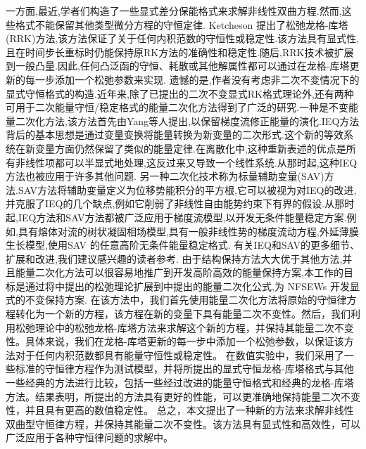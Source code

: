 一方面,最近,学者们构造了一些显式差分保能格式来求解非线性双曲方程\cite{macias-diazExplicitDissipationpreservingMethod2018,zhaoExplicitFourthorderEnergypreserving2019,fuExplicitStructurepreservingAlgorithm2020}.然而,这些格式不能保留其他类型微分方程的守恒定律.
Ketcheson \cite{ketchesonRelaxationRungeKutta2019}提出了松弛龙格-库塔(RRK)方法,该方法保证了关于任何内积范数的守恒性或稳定性.该方法具有显式性,且在时间步长重标时仍能保持原RK方法的准确性和稳定性.随后,RRK技术被扩展到一般凸量\cite{ranochaRelaxationRungeKutta2020}.因此,任何凸泛函的守恒、耗散或其他解属性都可以通过在龙格-库塔更新的每一步添加一个松弛参数来实现.
遗憾的是,作者没有考虑非二次不变情况下的显式守恒格式的构造.近年来,除了已提出的二次不变显式RK格式理论外,还有两种可用于二次能量守恒/稳定格式的能量二次化方法得到了广泛的研究.一种是不变能量二次化方法,该方法首先由Yang等人提出,以保留梯度流修正能量的演化.IEQ方法背后的基本思想是通过变量变换将能量转换为新变量的二次形式.这个新的等效系统在新变量方面仍然保留了类似的能量定律.在离散化中,这种重新表述的优点是所有非线性项都可以半显式地处理,这反过来又导致一个线性系统.从那时起,这种IEQ方法也被应用于许多其他问题.
另一种二次化技术称为标量辅助变量(SAV)方法.SAV方法将辅助变量定义为位移势能积分的平方根,它可以被视为对IEQ的改进,并克服了IEQ的几个缺点,例如它削弱了非线性自由能势约束下有界的假设.从那时起,IEQ方法和SAV方法都被广泛应用于梯度流模型,以开发无条件能量稳定方案.例如,具有熔体对流\cite{chenEfficientNumericalScheme2019}的树状凝固相场模型,具有一般非线性势的梯度流动方程\cite{yangConvergenceAnalysisInvariant2020d},外延薄膜生长模型\cite{chengHighlyEfficientAccurate2019},使用SAV \cite{gongArbitrarilyHighorderUnconditionally2019}的任意高阶无条件能量稳定格式.
有关IEQ和SAV的更多细节、扩展和改进,我们建议感兴趣的读者参考\cite{zhaoNumericalApproximationsPhase2017,shenScalarAuxiliaryVariable2018,liuExponentialScalarAuxiliary2020,chengMultipleScalarAuxiliary2018}.
由于结构保持方法大大优于其他方法,并且能量二次化方法可以很容易地推广到开发高阶高效的能量保持方案,本工作的目标是通过将\cite{ketchesonRelaxationRungeKutta2019}中提出的松弛理论扩展到\cite{chengConvergenceEnergyconservingScheme2022}中提出的能量二次化公式,为 NFSEWs 开发显式的不变保持方案.
在该方法中，我们首先使用能量二次化方法将原始的守恒律方程转化为一个新的方程，该方程在新的变量下具有能量二次不变性。然后，我们利用松弛理论中的松弛龙格-库塔方法来求解这个新的方程，并保持其能量二次不变性。具体来说，我们在龙格-库塔更新的每一步中添加一个松弛参数，以保证该方法对于任何内积范数都具有能量守恒性或稳定性。
在数值实验中，我们采用了一些标准的守恒律方程作为测试模型，并将所提出的显式守恒龙格-库塔格式与其他一些经典的方法进行比较，包括一些经过改进的能量守恒格式和经典的龙格-库塔方法。结果表明，所提出的方法具有更好的性能，可以更准确地保持能量二次不变性，并且具有更高的数值稳定性。
总之，本文提出了一种新的方法来求解非线性双曲型守恒律方程，并保持其能量二次不变性。该方法具有显式性和高效性，可以广泛应用于各种守恒律问题的求解中。


